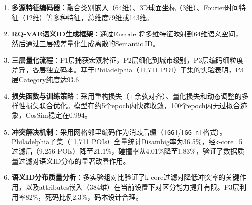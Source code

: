 \begin{enumerate}
    \item \textbf{多源特征编码器}：融合类别嵌入（64维）、3D球面坐标（3维）、Fourier时间特征（12维）等多种特征，总维度79维或143维。
    \item \textbf{RQ-VAE语义ID生成框架}：通过Encoder将多维特征映射到64维语义空间，然后通过三层残差量化生成离散的Semantic ID。
    \item \textbf{三层量化流程}：P1层捕获宏观特征，P2层细化到城市级别，P3层编码细粒度差异，各层独立码本。基于Philadelphia（11,711 POI）子集的实验表明，P3层Category纯度达93.6%
    \item \textbf{损失函数与训练策略}：采用重构损失（+余弦对齐）、量化损失和动态调整的多样性损失联合优化。模型在约5个epoch内快速收敛，100个epoch内无过拟合迹象，CosSim稳定在0.994。
    \item \textbf{冲突解决机制}：采用网格邻里编码作为消歧后缀（\verb|[GG]|/\verb|[GG_n]|格式）。Philadelphia子集（11,711 POIs）全量统计Disambig率为36.5\%，经k-core=5过滤后（9,256 POIs）降至21.1\%，碰撞率从4.01\%降至1.83\%，验证了数据质量过滤对语义ID分布的显著改善作用。
    \item \textbf{语义ID分布质量分析}：多实验组对比验证了k-core过滤对降低冲突率的关键作用，以及attributes嵌入（384维）在当前设置下对区分能力提升有限。P3层利用率82\%，死码比例2.3\%，码本设计合理。
\end{enumerate}
